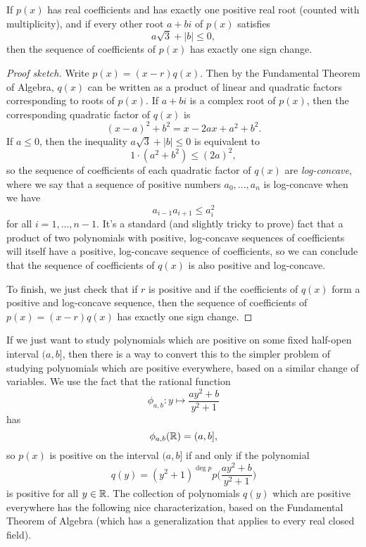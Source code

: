 \begin{thm} If $p(x)$ has real coefficients and has exactly one positive real root (counted with multiplicity), and if every other root $a+bi$ of $p(x)$ satisfies
\[
a\sqrt{3} + |b| \le 0,
\]
then the sequence of coefficients of $p(x)$ has exactly one sign change.
\end{thm}
\begin{proof}[Proof sketch] Write $p(x) = (x-r)q(x)$. Then by the Fundamental Theorem of Algebra, $q(x)$ can be written as a product of linear and quadratic factors corresponding to roots of $p(x)$. If $a+bi$ is a complex root of $p(x)$, then the corresponding quadratic factor of $q(x)$ is
\[
(x-a)^2 + b^2 = x - 2ax + a^2 + b^2.
\]
If $a \le 0$, then the inequality $a\sqrt{3} + |b| \le 0$ is equivalent to
\[
1\cdot(a^2 + b^2) \le (2a)^2,
\]
so the sequence of coefficients of each quadratic factor of $q(x)$ are \emph{log-concave}, where we say that a sequence of positive numbers $a_0, ..., a_n$ is log-concave when we have
\[
a_{i-1}a_{i+1} \le a_i^2
\]
for all $i = 1, ..., n-1$. It's a standard (and slightly tricky to prove) fact that a product of two polynomials with positive, log-concave sequences of coefficients will itself have a positive, log-concave sequence of coefficients, so we can conclude that the sequence of coefficients of $q(x)$ is also positive and log-concave.%

To finish, we just check that if $r$ is positive and if the coefficients of $q(x)$ form a positive and log-concave sequence, then the sequence of coefficients of $p(x) = (x-r)q(x)$ has exactly one sign change.
\end{proof}

If we just want to study polynomials which are positive on some fixed half-open interval $(a,b]$, then there is a way to convert this to the simpler problem of studying polynomials which are positive everywhere, based on a similar change of variables. We use the fact that the rational function
\[
\phi_{a,b} : y \mapsto \frac{ay^2 + b}{y^2 + 1}
\]
has
\[
\phi_{a,b}(\mathbb{R}) = (a,b],
\]
so $p(x)$ is positive on the interval $(a,b]$ if and only if the polynomial
\[
q(y) = (y^2 + 1)^{\deg p} p\Big(\frac{ay^2 + b}{y^2 + 1}\Big)
\]
is positive for all $y \in \mathbb{R}$. The collection of polynomials $q(y)$ which are positive everywhere has the following nice characterization, based on the Fundamental Theorem of Algebra (which has a generalization that applies to every real closed field).

